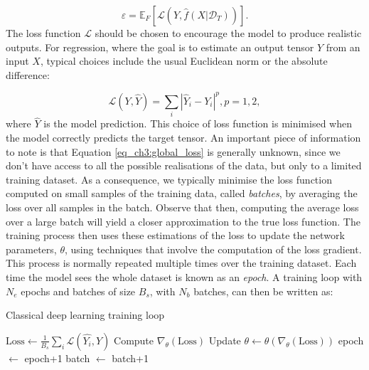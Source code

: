 \begin{equation}
    \varepsilon =\mathbb{E}_F[\mathcal{L}(Y,\hat{f}(X|\mathcal{D}_T))].
\end{equation}
The loss function $\mathcal{L}$ should be chosen to encourage the model to produce realistic outputs. For regression, where the goal is to estimate an output tensor $Y$ from an input $X$, typical choices include the usual Euclidean norm or the absolute difference:

\begin{equation}\label{eq:euclidean norm}
    \mathcal{L}(Y,\hat{Y})=\sum_i |\hat{Y}_i-Y_i|^p, p=1,2,
\end{equation}
where $\hat{Y}$ is the model prediction. This choice of loss function is minimised when the model correctly predicts the target tensor.
An important piece of information to note is that Equation \ref{eq_ch3:global_loss} is generally unknown, since we don't have access to all the possible realisations of the data, but only to a limited training dataset. As a consequence, we typically minimise the loss function computed on small samples of the training data, called \emph{batches}, by averaging the loss over all samples in the batch. Observe that then, computing the average loss over a large batch will yield a closer approximation to the true loss function. The training process then uses these estimations of the loss to update the network parameters, $\theta$, using techniques that involve the computation of the loss gradient. This process is normally repeated multiple times over the training dataset. Each time the model sees the whole dataset is known as an \emph{epoch}. A training loop with $N_e$ epochs and batches of size $B_s$, with $N_b$ batches, can then be written as:

\begin{algorithm}
    \caption{Classical deep learning training loop}\label{alg:training loop}
    \begin{algorithmic}
        \State $\text{Loss}\gets \frac{1}{B_s}\sum_i\mathcal{L}(\hat{Y_i},Y) $
        \State Compute $\nabla_\theta (\text{Loss})$
        \State Update $\theta \gets \theta(\nabla_\theta (\text{Loss}))$
        \State epoch $\gets$ epoch+1
        \State batch $\gets$ batch+1
        \EndWhile    
    \EndWhile
    \end{algorithmic}
    \end{algorithm}

